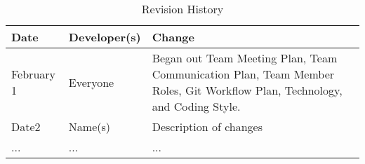\documentclass{article}
\begin{document}
\newpage

\begin{table}[hp]
\caption{Revision History} \label{TblRevisionHistory}
\begin{tabularx}{\textwidth}{llX}
\toprule
\textbf{Date} & \textbf{Developer(s)} & \textbf{Change}\\
\midrule
February 1 & Everyone & Began out Team Meeting Plan, Team Communication Plan, Team Member Roles, Git Workflow Plan, Technology, and Coding Style. \\
Date2 & Name(s) & Description of changes\\
... & ... & ...\\
\bottomrule
\end{tabularx}
\end{table}
\end{document}
